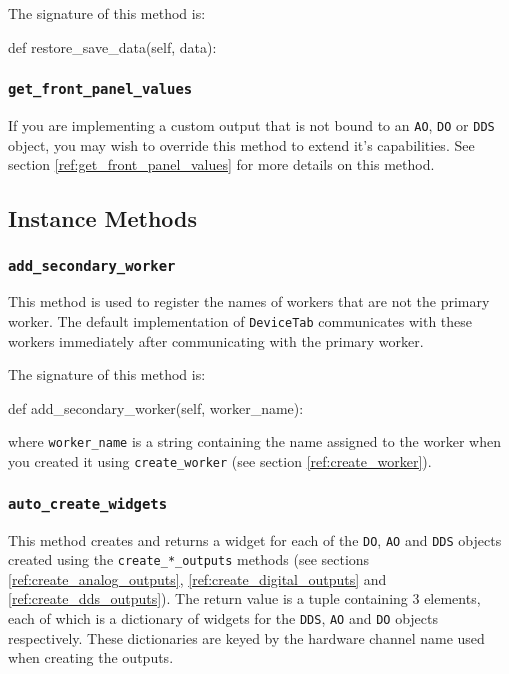 \documentclass[12pt]{article}
\begin{document}
The signature of this method is:
\begin{python}
def restore_save_data(self, data):
\end{python}

\subsubsection{\texttt{get\_front\_panel\_values}}\label{ref:override_get_front_panel_values}
If you are implementing a custom output that is not bound to an \texttt{AO}, \texttt{DO} or \texttt{DDS} object, you may wish to override this method to extend it's capabilities.
See section \ref{ref:get_front_panel_values} for more details on this method.

\subsection{Instance Methods}
%
%

\subsubsection{\texttt{add\_secondary\_worker}}\label{ref:add_secondary_worker}
This method is used to register the names of workers that are not the primary worker.
The default implementation of \texttt{DeviceTab} communicates with these workers immediately after communicating with the primary worker.

The signature of this method is:
\begin{python}
def add_secondary_worker(self, worker_name):
\end{python}
where \texttt{worker\_name} is a string containing the name assigned to the worker when you created it using \texttt{create\_worker} (see section \ref{ref:create_worker}).

\subsubsection{\texttt{auto\_create\_widgets}}\label{ref:auto_create_widgets}
This method creates and returns a widget for each of the \texttt{DO}, \texttt{AO} and \texttt{DDS} objects created using the \texttt{create\_*\_outputs} methods (see sections \ref{ref:create_analog_outputs}, \ref{ref:create_digital_outputs} and \ref{ref:create_dds_outputs}).
The return value is a tuple containing 3 elements, each of which is a dictionary of widgets for the \texttt{DDS}, \texttt{AO} and \texttt{DO} objects respectively.
These dictionaries are keyed by the hardware channel name used when creating the outputs.
\end{document}
